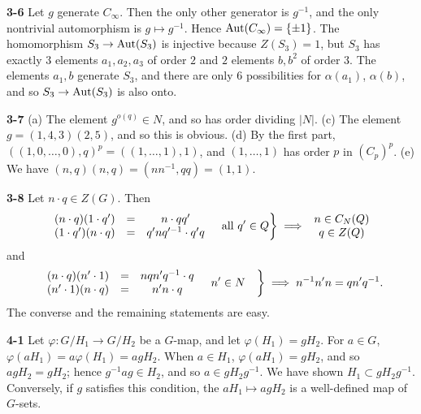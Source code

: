 \documentclass[a4paper,11pt,final]{memoir}%
\theoremstyle{nonumberplain}
\begin{document}
\bigskip\noindent\textbf{3-6}
Let $g$ generate $C_{\infty}$. Then the only other generator is $g^{-1}$, and
the only nontrivial automorphism is $g\mapsto g^{-1}$. Hence $\operatorname{Aut}(C_{\infty
})=\{\pm1\}$. The homomorphism $S_{3}\rightarrow\operatorname{Aut}(S_{3})$ is injective
because $Z(S_{3})=1$, but $S_{3}$ has exactly $3$ elements $a_{1},a_{2},a_{3}$
of order $2$ and $2$ elements $b,b^{2}$ of order $3$. The elements $a_{1},b$
generate $S_{3}$, and there are only $6$ possibilities for $\alpha(a_{1})$,
$\alpha(b)$, and so $S_{3}\rightarrow\operatorname{Aut}(S_{3})$ is also onto.

\bigskip\noindent\textbf{3-7}
(a) The element $g^{o(q)}\in N$, and so has order dividing $|N|$. (c) The
element $g=(1,4,3)(2,5)$, and so this is obvious. (d) By the first part,
$\left(  (1,0,\ldots,0),q\right)  ^{p}=((1,\ldots,1),1)$, and $(1,\ldots,1)$
has order $p$ in $(C_{p})^{p}$. (e) We have $(n,q)(n,q)=(nn^{-1},qq)=(1,1).$

\bigskip\noindent\textbf{3-8}
Let $n\cdot q\in Z(G)$. Then%
\[
\left.
\begin{array}
[c]{ccc}%
(n\cdot q)(1\cdot q^{\prime}) & = & n\cdot qq^{\prime}\\
(1\cdot q^{\prime})(n\cdot q) & = & q^{\prime}nq^{\prime-1}\cdot q^{\prime}q
\end{array}
\quad\text{all }q^{\prime}\in Q\right\}  \implies%
\begin{array}
[c]{c}%
n\in C_{N}(Q)\\
q\in Z(Q)
\end{array}
\]
and%
\[
\left.
\begin{array}
[c]{ccc}%
(n\cdot q)(n^{\prime}\cdot1) & = & nqn^{\prime}q^{-1}\cdot q\\
(n^{\prime}\cdot1)(n\cdot q) & = & n^{\prime}n\cdot q
\end{array}
\quad n^{\prime}\in N\quad\right\}  \implies n^{-1}n^{\prime}n=qn^{\prime
}q^{-1}.
\]
The converse and the remaining statements are easy.

\bigskip\noindent\textbf{4-1}
Let $\varphi\colon G/H_{1}\rightarrow G/H_{2}$ be a $G$-map, and let
$\varphi(H_{1})=gH_{2}$. For $a\in G$, $\varphi(aH_{1})=a\varphi
(H_{1})=agH_{2}$. When $a\in H_{1}$, $\varphi(aH_{1})=gH_{2}$, and so
$agH_{2}=gH_{2}$; hence $g^{-1}ag\in H_{2}$, and so $a\in gH_{2}g^{-1}$. We
have shown $H_{1}\subset gH_{2}g^{-1}$. Conversely, if $g$ satisfies this
condition, the $aH_{1}\mapsto agH_{2}$ is a well-defined map of $G$-sets.
\end{document}

